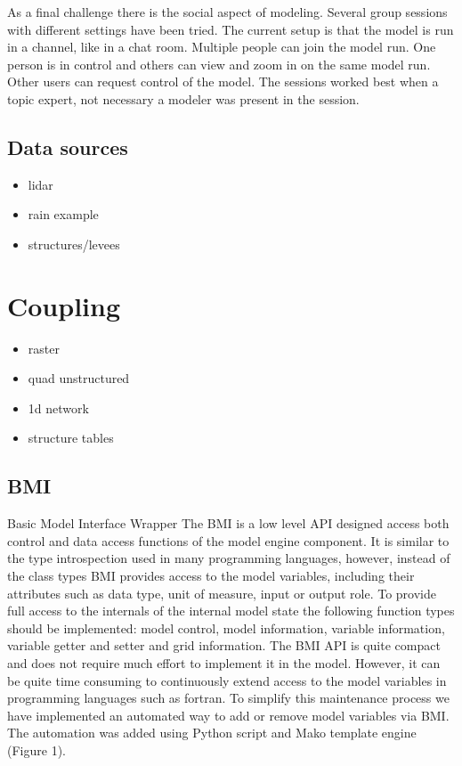 \documentclass[a4paper]{article}
\begin{document}
As a final challenge there is the social aspect of modeling. Several group sessions with different settings have been tried. The current setup is that the model is run in a channel, like in a chat room. Multiple people can join the model run. One person is in control and others can view and zoom in on the same model run. Other users can request control of the model. The sessions worked best when a topic expert, not necessary a modeler was present in the session.

\subsection{Data sources }
\begin{itemize}
  \item lidar
  \item rain example
  \item structures/levees
\end{itemize}

\section{Coupling}
\label{sec:coupling}

\begin{itemize}
  \item raster
  \item quad unstructured
  \item 1d network
  \item structure tables
\end{itemize}

\subsection{BMI}

Basic Model Interface Wrapper
The \ac{BMI} is a low level API designed access both control and data access functions of the model engine component. It is similar to the type introspection used in many programming languages, however, instead of the class types \ac{BMI} provides access to the model variables, including their attributes such as data type, unit of measure, input or output role. To provide full access to the internals of the internal model state the following function types should be implemented: model control, model information, variable information, variable getter and setter and grid information. The \ac{BMI} API is quite compact and does not require much effort to implement it in the model. However, it can be quite time consuming to continuously extend access to the model variables in programming languages such as fortran. To simplify this maintenance process we have implemented an automated way to add or remove model variables via \ac{BMI}. The automation was added using Python script and Mako template engine (Figure 1).
\end{document}
